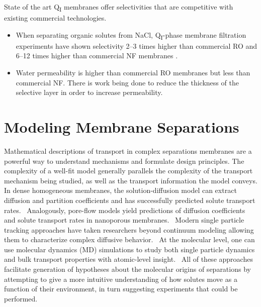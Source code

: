   
  State of the art Q\textsubscript{I} membranes offer selectivities that
  are competitive with existing commercial technologies.
  \begin{itemize}
    \item When separating organic solutes from NaCl, Q\textsubscript{I}-phase
    membrane filtration experiments have shown selectivity 2--3 times higher than
    commercial RO and 6--12 times higher than commercial NF membranes
    \cite{dischinger_application_2017}.
    \item Water permeability is higher than commercial RO membranes but
    less than commercial NF. There is work being done to reduce the
    thickness of the selective layer in order to increase permeability. 
  \end{itemize}

  \section{Modeling Membrane Separations}
  
  Mathematical descriptions of transport in complex separations membranes are a
  powerful way to understand mechanisms and formulate design principles.
  \cite{vinh-thang_predictive_2013,geens_transport_2006,darvishmanesh_mass_2016}
  The complexity of a well-fit model generally parallels the complexity of the
  transport mechanism being studied, as well as the transport information the
  model conveys. In dense homogeneous membranes, the solution-diffusion model
  can extract diffusion and partition coefficients and has successfully
  predicted solute transport rates.~\cite{wijmans_solution-diffusion_1995}
  Analogously, pore-flow models yield predictions of diffusion coefficients and
  solute transport rates in nanoporous membranes.~\cite{paul_diffusive_1974}
  Modern single particle tracking approaches have taken researchers beyond
  continuum modeling allowing them to characterize complex diffusive
  behavior.~\cite{manzo_review_2015} At the molecular level, one can use
  molecular dynamics (MD) simulations to study both single particle dynamics
  and bulk transport properties with atomic-level
  insight.~\cite{coscia_chemically_2019,maginn_best_2018} All of these
  approaches facilitate generation of hypotheses about the molecular origins of
  separations by attempting to give a more intuitive understanding of how
  solutes move as a function of their environment, in turn suggesting
  experiments that could be performed.

